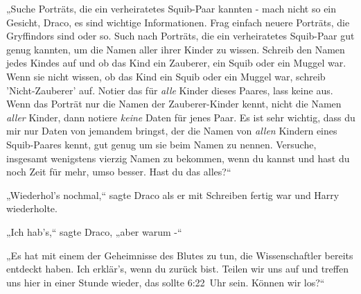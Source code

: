 „Suche Porträts, die ein verheiratetes Squib-Paar kannten - mach nicht so ein Gesicht, Draco, es sind wichtige Informationen. Frag einfach neuere Porträts, die Gryffindors sind oder so. Such nach Porträts, die ein verheiratetes Squib-Paar gut genug kannten, um die Namen aller ihrer Kinder zu wissen. Schreib den Namen jedes Kindes auf und ob das Kind ein Zauberer, ein Squib oder ein Muggel war. Wenn sie nicht wissen, ob das Kind ein Squib oder ein Muggel war, schreib 'Nicht-Zauberer' auf. Notier das für \emph{alle} Kinder dieses Paares, lass keine aus. Wenn das Porträt nur die Namen der Zauberer-Kinder kennt, nicht die Namen \emph{aller} Kinder, dann notiere \emph{keine} Daten für jenes Paar. Es ist sehr wichtig, dass du mir nur Daten von jemandem bringst, der die Namen von \emph{allen} Kindern eines Squib-Paares kennt, gut genug um sie beim Namen zu nennen. Versuche, insgesamt wenigstens vierzig Namen zu bekommen, wenn du kannst und hast du noch Zeit für mehr, umso besser. Hast du das alles?“

„Wiederhol's nochmal,“ sagte Draco als er mit Schreiben fertig war und Harry wiederholte.

„Ich hab's,“ sagte Draco, „aber warum -“

„Es hat mit einem der Geheimnisse des Blutes zu tun, die Wissenschaftler bereits entdeckt haben. Ich erklär's, wenn du zurück bist. Teilen wir uns auf und treffen uns hier in einer Stunde wieder, das sollte 6:22~Uhr sein. Können wir los?“

